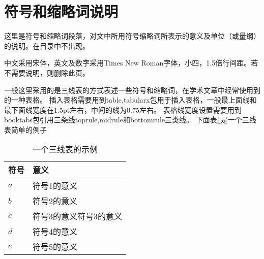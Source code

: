 \chapter*{符号和缩略词说明}

这里是符号和缩略词段落，对文中所用符号缩略词所表示的意义及单位（或量纲）的说明。在目录中不出现。

中文采用宋体，英文及数字采用Times New Roman字体，小四，1.5倍行间距。若不需要说明，则删除此页。

一般这里采用的是三线表的方式表述一些符号和缩略词，在学术文章中经常使用到的一种表格。
插入表格需要用到table,tabularx包用于插入表格，一般最上面线和最下面线宽度在1.5pt左右，中间的线为0.75左右。
表格线宽度设置需要用到booktabs包引用三条线toprule,midrule和bottomrule三类线。
下面表\ref{tab:three_lines_table}是一个三线表简单的例子

\begin{table}[htp!]
    \centering
    \caption{一个三线表的示例}
    \label{tab:three_lines_table}
    \renewcommand\arraystretch{1.5} %
    \begin{tabularx}{0.9\textwidth}{p{2cm}<{\centering}p{6cm}<{\raggedright}}
        \toprule[1.5pt]
            符号    &   \quad 意义 \\
            \midrule[0.75pt]
            $ a $  &  符号1的意义    \\
            \hline
            $ b $  &  符号2的意义    \\
            \hline
            $ c $  &  符号3的意义符号3的意义    \\
            \hline
            $ d $  &  符号4的意义    \\
            \hline
            $ e $  &  符号5的意义     \\
        \bottomrule[1.5pt]
    \end{tabularx}
\end{table}

